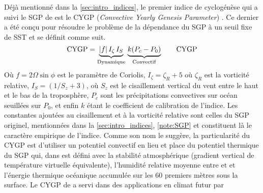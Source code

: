 \documentclass[../main.tex]{subfiles}
\begin{document}
Déjà mentionné dans la \cref{sec:intro_indices}, le premier indice de cyclogénèse qui a suivi le SGP de \citeauthor{gray_tropical_1975} est le CYGP
(\textit{Convective Yearly Genesis Parameter}) \parencite{royer_gcm_1998}. Ce dernier a été conçu pour résoudre le problème de la dépendance du SGP à un seuil
fixe de SST et se définit comme suit.
%
\begin{equation*} \mathrm{CYGP} = \underbrace{\lvert f \rvert \, I_\zeta \, I_S}_{\mathrm{Dynamique}} \, \underbrace{\vphantom{I_\zeta}k(P_c -
P_0)}_{\mathrm{Convectif}} \tag*{CYGP}
\end{equation*}
%
Où $f = 2 \Omega \sin \phi$ est le paramètre de Coriolis, $I_\zeta = \zeta_R \! +\! 5$ où $\zeta_R$ est la vorticité relative, $I_S = (1/S_z \! + \! 3)$, où
$S_z$ est le cisaillement vertical du vent entre le haut et le bas de la troposphère, $P_c$ sont les précipitations convectives sur océan seuillées sur $P_0$,
et enfin $k$ étant le coefficient de calibration de l'indice. Les constantes ajoutées au cisaillement et à la vorticité relative sont celles du SGP originel,
mentionnées dans la \cref{sec:intro_indices}, \cref{note:SGP} et constituent là le caractère empirique de l'indice. Comme son nom le suggère, la particularité
du CYGP est d'utiliser un potentiel convectif en lieu et place du potentiel thermique du SGP qui, dans \textcite{gray_tropical_1975} est défini avec la
stabilité atmosphérique (gradient vertical de température virtuelle équivalente), l'humidité relative moyenne entre  et  et l'énergie
thermique océanique accumulée sur les 60 premiers mètres sous la surface. Le CYGP de \citeauthor{royer_gcm_1998} a servi dans des applications en climat futur
par \textcite{mcdonald_tropical_2005,cattiaux_projected_2020,chauvin_response_2006,chauvin_future_2020}
\end{document}

